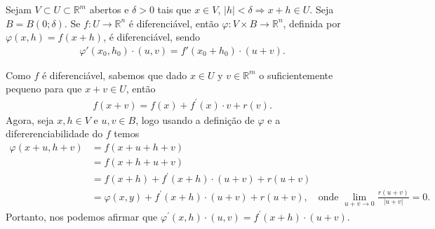 \begin{homeworkProblem}[Seção 1-3]
  Sejam $V \subset U \subset \mathbb{R}^m$ abertos e $\delta > 0$ tais que $x \in V$, $|h|<\delta \Rightarrow x+h \in U$. Seja $B = B(0;\delta)$. Se $f : U \to \mathbb{R}^n$ é diferenciável, então $\varphi : V \times B \to \mathbb{R}^n$, definida por $\varphi(x,h)=f(x+h)$, é diferenciável, sendo
  \begin{align*}
    \varphi'(x_0,h_0)\cdot (u,v) = f'(x_0+h_0)\cdot (u+v).   
  \end{align*}
  \begin{solution}
    Como $f$ é diferenciável, sabemos que dado $x\in U$ y $v\in \mathbb{R}^{m}$ o suficientemente pequeno para que $x+v\in U$, então
    \begin{align*}
      f(x+v)=f(x)+f^{\prime}(x)\cdot v+r(v).
    \end{align*}
    Agora, seja $x,h\in V$ e $u,v\in B$, logo usando a definição de $\varphi$ e a difererenciabilidade do $f$ temos 
    \begin{align*}
      \varphi(x+u,h+v)&=f(x+u+h+v)\\
      &=f(x+h+u+v)\\
      &=f(x+h)+f^{\prime}(x+h)\cdot(u+v)+r(u+v)\\
      &=\varphi(x,y)+f^{\prime}(x+h)\cdot (u+v)+r(u+v),\quad\text{onde }\lim_{u+v \to 0}\frac{r(u+v)}{|u+v|}=0.
    \end{align*}
    Portanto, nos podemos afirmar que $\varphi^{\prime}(x,h)\cdot(u,v)=f^{\prime}(x+h)\cdot(u+v)$.
  \end{solution}
\end{homeworkProblem}
